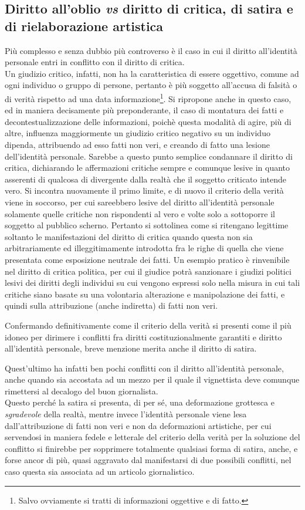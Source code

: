 \subsection{Diritto all'oblio \textit{vs} diritto di critica, di satira e di rielaborazione artistica}
Più complesso e senza dubbio più controverso è il caso in cui il diritto all'identità personale entri in conflitto con il diritto di critica.
\\Un giudizio critico, infatti, non ha la caratteristica di essere oggettivo, comune ad ogni individuo o gruppo di persone, pertanto è più soggetto all'accusa di falsità o di verità rispetto ad una data informazione\footnote{Salvo ovviamente si tratti di informazioni oggettive e di fatto.}.
Si ripropone anche in questo caso, ed in maniera decisamente più preponderante, il caso di montatura dei fatti e decontestualizzazione delle informazioni, poichè questa modalità di agire, più di altre, influenza maggiormente un giudizio critico negativo su un individuo dipenda, attribuendo ad esso fatti non veri, e creando di fatto una lesione dell'identità personale. 
Sarebbe a questo punto semplice condannare il diritto di critica, dichiarando le affermazioni critiche sempre e comunque lesive in quanto asserenti di qualcosa di divergente dalla realtà che il soggetto criticato intende vero. Si incontra nuovamente il primo limite, e di nuovo il criterio della verità viene in soccorso, per cui sareebbero lesive del diritto all'identità personale solamente quelle critiche non rispondenti al vero e volte solo a sottoporre il soggetto al pubblico scherno. Pertanto si sottolinea come si ritengano legittime soltanto le manifestazioni del diritto di critica quando questa non sia arbitrariamente ed illeggitimamente introdotta fra le righe di quella che viene presentata come esposizione neutrale dei fatti.
Un esempio pratico è rinvenibile nel diritto di critica politica, per cui il giudice potrà sanzionare i giudizi politici lesivi dei diritti degli individui su cui vengono espressi solo nella misura in cui tali critiche siano basate su una volontaria alterazione e manipolazione dei fatti, e quindi sulla attribuzione (anche indiretta) di fatti non veri.


Confermando definitivamente come il criterio della verità si presenti come il più idoneo per dirimere i conflitti fra diritti costituzionalmente garantiti e diritto all'identità personale, breve menzione merita anche il diritto di satira.

Quest'ultimo ha infatti ben pochi conflitti con il diritto all’identità personale, anche quando sia accostata ad un mezzo per il quale il vignettista deve comunque rimettersi al decalogo del buon giornalista.
\\Questo perché la satira si presenta, di per sé, una deformazione grottesca e \textit{sgradevole} della realtà, mentre invece l’identità personale viene lesa dall’attribuzione di fatti non veri e non da deformazioni artistiche, per cui servendosi in maniera fedele e letterale del criterio della verità per la soluzione del conflitto si finirebbe per sopprimere totalmente qualsiasi forma di satira, anche, e forse ancor di più, quasi aggravato dal manifestarsi di due possibili conflitti, nel caso questa sia associata ad un articolo giornalistico.



